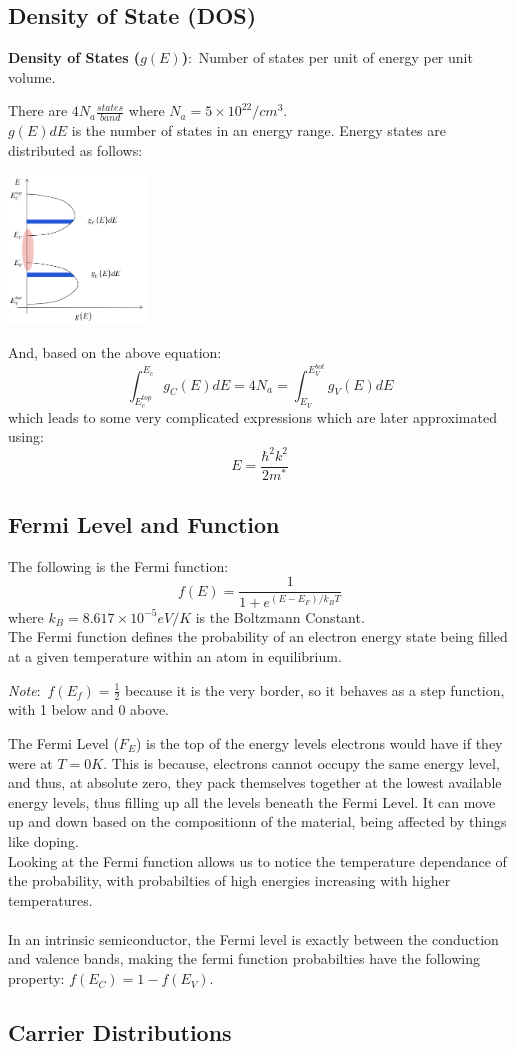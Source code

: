 \documentclass[nobib]{tufte-handout}
\newcommand{\defn}[2]{
        \begin{defbox}
        \noindent\textbf{#1}:\ #2
        \end{defbox}
}
\newcommand{\note}[1]{
        \begin{notebox}
        \noindent\textit{Note}:\ #1
        \end{notebox}
}
\begin{document}
\subsection{Density of State (DOS)}
\defn{Density of States ($g(E)$)}{Number of states per unit of energy per unit volume.}
There are $4N_a \frac{states}{band}$ where $N_a = 5\times 10^{22}/cm^3$.\\
$g(E)dE$ is the number of states in an energy range.
Energy states are distributed as follows:
\begin{center}
    \includegraphics*[height = 150px]{images/dos.png}
\end{center}
And, based on the above equation:
\begin{equation*}
    \int_{E_c^{top}}^{E_c} g_C(E)dE = 4N_a = \int_{E_V}^{E_V^{bot}} g_V(E)dE
\end{equation*}
which leads to some very complicated expressions which are later approximated using:
\begin{equation*}
    E = \frac{\hbar^2k^2}{2m^*}
\end{equation*}
\subsection{Fermi Level and Function}
The following is the Fermi function:
\begin{equation*}
    f(E) = \frac{1}{1+e^{(E-E_F)/k_B T}}
\end{equation*}
where $k_B = 8.617\times 10^{-5} eV/K$ is the Boltzmann Constant.\\
The Fermi function defines the probability of an electron energy state being filled at a given temperature within an atom in equilibrium.
\note{$f(E_f) = \frac{1}{2}$ because it is the very border, so it behaves as a step function, with 1 below and 0 above.}
The Fermi Level ($F_E$) is the top of the energy levels electrons would have if they were at $T=0K$. This is because, electrons cannot occupy the same energy level, and thus, at absolute zero, they pack themselves together at the lowest available energy levels, thus filling up all the levels beneath the Fermi Level.
It can move up and down based on the compositionn of the material, being affected by things like doping.\\
Looking at the Fermi function allows us to notice the temperature dependance of the probability, with probabilties of high energies increasing with higher temperatures.\\~\\
In an intrinsic semiconductor, the Fermi level is exactly between the conduction and valence bands, making the fermi function probabilties have the following property: $f(E_C) = 1-f(E_V)$.
\subsection{Carrier Distributions}
\end{document}
